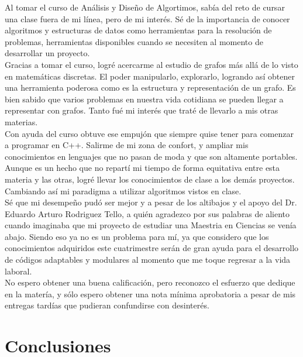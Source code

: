 \documentclass[oneside,onecolumn]{article}
\begin{document}
Al tomar el curso de Análisis y Diseño de Algortimos, sabía del reto de cursar una clase fuera de mi línea, pero de mi interés. Sé de la importancia de conocer algoritmos y estructuras de datos como herramientas para la resolución de problemas, herramientas disponibles cuando se necesiten al momento de desarrollar un proyecto.\\

Gracias a tomar el curso, logré acercarme al estudio de grafos más allá de lo visto en matemáticas discretas. El poder manipularlo, explorarlo, logrando así obtener una herramienta poderosa como es la estructura y representación de un grafo. Es bien sabido que varios problemas en nuestra vida cotidiana se pueden llegar a representar con grafos. Tanto fué mi interés que traté de llevarlo a mis otras materias.\\

Con ayuda del curso obtuve ese empujón que siempre quise tener para comenzar a programar en C++. Salirme de mi zona de confort, y ampliar mis conocimientos en lenguajes que no pasan de moda y que son altamente portables.\\

Aunque es un hecho que no repartí mi tiempo de forma equitativa entre esta materia y las otras, logré llevar los conocimientos de clase a los demás proyectos. Cambiando así mi paradigma a utilizar algoritmos vistos en clase.\\

Sé que mi desempeño pudó ser mejor y a pesar de los altibajos y el apoyo del Dr. Eduardo Arturo Rodriguez Tello, a quién agradezco por sus palabras de aliento cuando imaginaba que mi proyecto de estudiar una Maestria en Ciencias se venía abajo. Siendo eso ya no es un problema para mí, ya que considero que los conocimientos adquiridos este cuatrimestre serán de gran ayuda para el desarrollo de códigos adaptables y modulares al momento que me toque regresar a la vida laboral.\\

No espero obtener una buena calificación, pero reconozco el esfuerzo que dedique en la matería, y sólo espero obtener una nota mínima aprobatoria a pesar de mis entregas tardías que pudieran confundirse con desinterés.

\section{Conclusiones}
\end{document}
